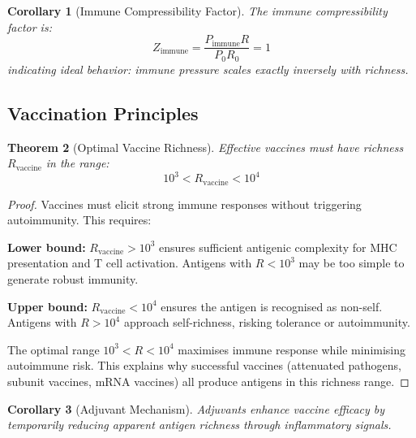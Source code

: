 \documentclass[11pt,twocolumn,a4paper]{article}
\newtheorem{theorem}{Theorem}[section]
\newtheorem{corollary}[theorem]{Corollary}
\theoremstyle{definition}
\theoremstyle{remark}
\begin{document}
\begin{corollary}[Immune Compressibility Factor]
\label{cor:immune_compressibility}
The immune compressibility factor is:
\begin{equation}
Z_{\mathrm{immune}} = \frac{P_{\mathrm{immune}} R}{P_0 R_0} = 1
\label{eq:immune_compressibility}
\end{equation}
indicating ideal behavior: immune pressure scales exactly inversely with richness.
\end{corollary}



\subsection{Vaccination Principles}

\begin{theorem}[Optimal Vaccine Richness]
\label{thm:optimal_vaccine}
Effective vaccines must have richness $R_{\mathrm{vaccine}}$ in the range:
\begin{equation}
10^3 < R_{\mathrm{vaccine}} < 10^4
\label{eq:optimal_vaccine_richness}
\end{equation}
\end{theorem}

\begin{proof}
Vaccines must elicit strong immune responses without triggering autoimmunity. This requires:

\textbf{Lower bound:} $R_{\mathrm{vaccine}} > 10^3$ ensures sufficient antigenic complexity for MHC presentation and T cell activation. Antigens with $R < 10^3$ may be too simple to generate robust immunity.

\textbf{Upper bound:} $R_{\mathrm{vaccine}} < 10^4$ ensures the antigen is recognised as non-self. Antigens with $R > 10^4$ approach self-richness, risking tolerance or autoimmunity.

The optimal range $10^3 < R < 10^4$ maximises immune response while minimising autoimmune risk. This explains why successful vaccines (attenuated pathogens, subunit vaccines, mRNA vaccines) all produce antigens in this richness range.
\end{proof}

\begin{corollary}[Adjuvant Mechanism]
\label{cor:adjuvant_mechanism}
Adjuvants enhance vaccine efficacy by temporarily reducing apparent antigen richness through inflammatory signals.
\end{corollary}
\end{document}

